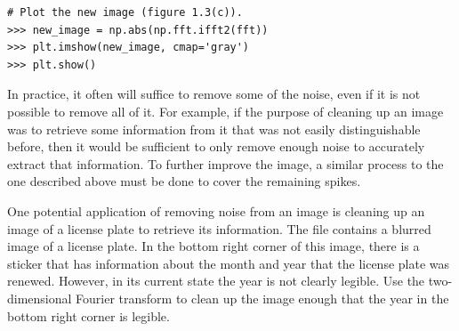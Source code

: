\begin{lstlisting}
# Plot the new image (figure 1.3(c)).
>>> new_image = np.abs(np.fft.ifft2(fft))
>>> plt.imshow(new_image, cmap='gray')
>>> plt.show()
\end{lstlisting}

In practice, it often will suffice to remove some of the noise, even if it is not possible to remove all of it.
For example, if the purpose of cleaning up an image was to retrieve some information from it that was not easily distinguishable before, then it would be sufficient to only remove enough noise to accurately extract that information.
To further improve the image, a similar process to the one described above must be done to cover the remaining spikes.

\begin{problem}
One potential application of removing noise from an image is cleaning up an image of a license plate to retrieve its information. 
The file  contains a blurred image of a license plate. 
In the bottom right corner of this image, there is a sticker that has information about the month and year that the license plate was renewed. 
However, in its current state the year is not clearly legible.
Use the two-dimensional Fourier transform to clean up the image enough that the year in the bottom right corner is legible. 
\end{problem}





